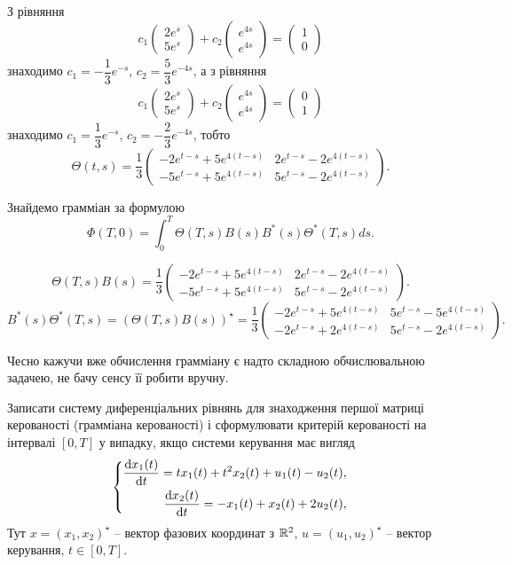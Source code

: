 \begin{solution}
    З рівняння
    \[ c_1 \begin{pmatrix} 2e^s \\ 5e^s \end{pmatrix} + c_2 \begin{pmatrix} e^{4s} \\ e^{4s} \end{pmatrix} = \begin{pmatrix} 1 \\ 0 \end{pmatrix} \]
    знаходимо $c_1 = -\dfrac13 e^{-s}$, $c_2 = \dfrac53 e^{-4s}$, а з рівняння
    \[ c_1 \begin{pmatrix} 2e^s \\ 5e^s \end{pmatrix} + c_2 \begin{pmatrix} e^{4s} \\ e^{4s} \end{pmatrix} = \begin{pmatrix} 0 \\ 1 \end{pmatrix} \]
    знаходимо $c_1 = \dfrac13 e^{-s}$, $c_2 = -\dfrac23 e^{-4s}$, тобто
    \[ \Theta(t, s) = \dfrac13\begin{pmatrix} -2 e^{t-s} + 5 e^{4(t-s)} & 2 e^{t-s} - 2 e^{4(t-s)} \\ -5 e^{t-s} + 5 e^{4(t-s)} & 5 e^{t-s} - 2 e^{4(t-s)} \end{pmatrix}. \]
    
    Знайдемо грамміан за формулою \[\Phi(T, 0) = \int_0^T \Theta(T, s) B(s) B^* (s) \Theta^*(T, s) ds. \]
    
    \[ \Theta(T, s) B(s) =  \dfrac13\begin{pmatrix} -2 e^{t-s} + 5 e^{4(t-s)} & 2 e^{t-s} - 2 e^{4(t-s)} \\ -5 e^{t-s} + 5 e^{4(t-s)} & 5 e^{t-s} - 2 e^{4(t-s)} \end{pmatrix}. \]
    \[ B^* (s) \Theta^*(T, s)  =  (\Theta(T, s) B(s))^\star =  \dfrac13\begin{pmatrix} -2 e^{t-s} + 5 e^{4(t-s)} & 5 e^{t-s} - 5 e^{4(t-s)} \\ -2 e^{t-s} + 2 e^{4(t-s)} & 5 e^{t-s} - 2 e^{4(t-s)} \end{pmatrix}. \]
    
    Чесно кажучи вже обчислення грамміану є надто складною обчислювальною задачею, не бачу сенсу її робити вручну.
\end{solution}

\begin{problem}
    Записати систему диференціальних рівнянь для знаходження першої матриці керованості (грамміана керованості) і сформулювати критерій керованості на інтервалі $[0,T]$ у випадку, якщо системи керування має вигляд \[ \left\{ \begin{aligned} \frac{\mathop{}\!\mathrm{d} x_1(t)}{\mathop{}\!\mathrm{d} t} = tx_1(t) + t^2x_2(t) + u_1(t)-u_2(t), \\ \frac{\mathop{}\!\mathrm{d} x_2(t)}{\mathop{}\!\mathrm{d} t} = -x_1(t) + x_2(t) + 2u_2(t), \end{aligned} \right. \] Тут $x = (x_1, x_2)^\star$ -- вектор фазових координат з $\mathbb{R}^2$, $u=(u_1,u_2)^\star$ -- вектор керування, $t \in [0, T]$.
\end{problem}

